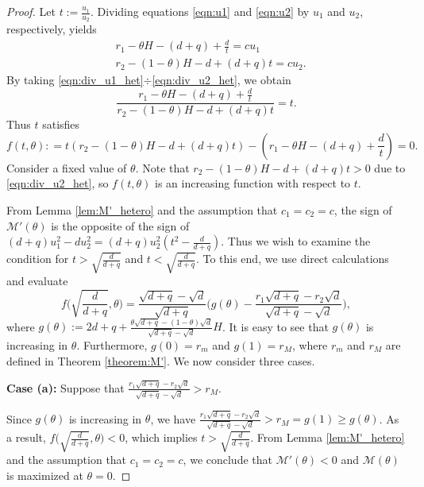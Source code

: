 \documentclass[11pt]{article}
\def\MM{\mathcal{M}}
\theoremstyle{definition}
\begin{document}
\begin{proof}
    Let $t:=\frac{u_1}{u_2}$. Dividing equations \eqref{eqn:u1} and \eqref{eqn:u2} by $u_1$ and $u_2$, respectively, yields
 \begin{subequations}
     \begin{align}
         &r_1-\theta H -(d+q) + \frac{d}{t}=cu_1 \label{eqn:div_u1_het}\\
         &r_2-(1-\theta)H -d + (d+q)t = cu_2. \label{eqn:div_u2_het}
     \end{align}
\end{subequations}
By taking \eqref{eqn:div_u1_het}$\div$\eqref{eqn:div_u2_het}, we obtain
\[
\frac{r_1-\theta H -(d+q) + \frac{d}{t}}{r_2-(1-\theta)H -d + (d+q)t}=t.
\]
Thus $t$ satisfies
\[
f(t,\theta) : = t(r_2-(1-\theta)H -d + (d+q)t) - (r_1-\theta H -(d+q) + \frac{d}{t}) =0.
\]
Consider a fixed value of $\theta$. Note that $r_2-(1-\theta)H -d + (d+q)t>0$ due to \eqref{eqn:div_u2_het}, so $f(t,\theta)$ is an increasing function with respect to $t$. 


From Lemma \ref{lem:M'_hetero} and the assumption that $c_1=c_2=c$, the sign of $\MM'(\theta)$ is the opposite of the sign of $(d+q)u_1^2-du_2^2=(d+q)u_2^2(t^2-\frac{d}{d+q})$. Thus we wish to examine the condition for $t>\sqrt{\frac{d}{d+q}}$ and $t<\sqrt{\frac{d}{d+q}}$. To this end, we use direct calculations and evaluate
\begin{equation}
    f\bigg(\sqrt{\frac{d}{d+q}},\theta\bigg) = \frac{\sqrt{d+q}-\sqrt{d}}{\sqrt{d+q}}\bigg(g(\theta)-\frac{r_1\sqrt{d+q}-r_2\sqrt{d}}{\sqrt{d+q}-\sqrt{d}}\bigg),
\end{equation}
where $g(\theta):=2d+q+\frac{\theta\sqrt{d+q}-(1-\theta)\sqrt{d}}{\sqrt{d+q}-\sqrt{d}}H$. It is easy to see that $g(\theta)$ is increasing in $\theta$. Furthermore, $g(0)=r_m$ and $g(1)=r_M$, where $r_m$ and $r_M$ are defined in Theorem \ref{theorem:M'}. We now consider three cases. 

\vspace{.1in}
\noindent\textbf{Case (a):} Suppose that
$\frac{r_1\sqrt{d+q}-r_2\sqrt{d}}{\sqrt{d+q}-\sqrt{d}}>r_M$.

Since $g(\theta)$ is increasing in $\theta$, we have $\frac{r_1\sqrt{d+q}-r_2\sqrt{d}}{\sqrt{d+q}-\sqrt{d}}>r_M=g(1)\geq g(\theta)$. As a result, 
$f\big(\sqrt{\frac{d}{d+q}},\theta\big) <0$, which implies $t>\sqrt{\frac{d}{d+q}}$. From Lemma \ref{lem:M'_hetero} and the assumption that $c_1=c_2=c$, we  conclude that $\MM'(\theta)<0$ and $\MM(\theta)$ is maximized at $\theta=0$.


\end{proof}
\end{document}
